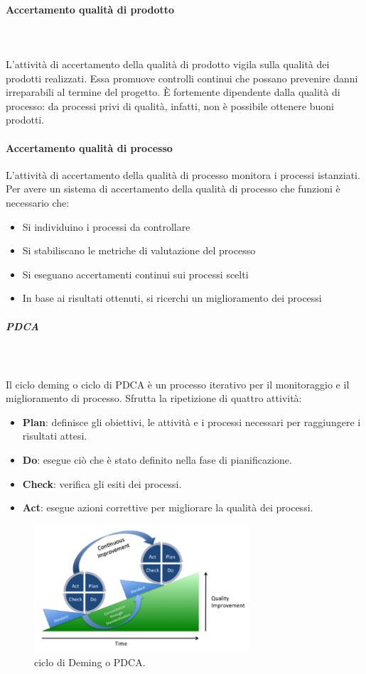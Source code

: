 \documentclass[../norme-di-progetto.tex]{subfiles}
\begin{document}
\paragraph{Accertamento qualità di prodotto}\mbox{}\\
\label{par:accertamento qualità di prodotto}
\\ L'attività di accertamento della qualità di prodotto vigila sulla qualità dei prodotti realizzati. Essa promuove controlli continui che possano prevenire danni irreparabili al termine del progetto. È fortemente dipendente dalla qualità di processo: da processi privi di qualità, infatti, non è possibile ottenere buoni prodotti.  
\paragraph{Accertamento qualità di processo}
\label{par:accertamento qualità di processo}
L'attività di accertamento della qualità di processo monitora i processi istanziati. Per avere un sistema di accertamento della qualità di processo che funzioni è necessario che:
\begin{itemize}
	\item Si individuino i processi da controllare
	\item Si stabiliscano le metriche di valutazione del processo
	\item Si eseguano accertamenti continui sui processi scelti
	\item In base ai risultati ottenuti, si ricerchi un miglioramento dei processi
\end{itemize} 
\subparagraph{PDCA}\mbox{}\\
\label{subp:PDCA}
\\Il ciclo deming o ciclo di PDCA è un processo iterativo per il monitoraggio e il miglioramento di processo. Sfrutta la ripetizione di quattro attività:
\begin{itemize}
	\item \textbf{Plan}: definisce gli obiettivi, le attività e i processi necessari per raggiungere i risultati attesi.
	\item \textbf{Do}: esegue ciò che è stato definito nella fase di pianificazione.
	\item \textbf{Check}: verifica gli esiti dei processi.
	\item \textbf{Act}: esegue azioni correttive per migliorare la qualità dei processi.
\end{itemize}
\begin{figure}[H]
\includegraphics[width=8cm]{components/PDCA-process.png}
\centering
\caption{ciclo di Deming o PDCA.}
\end{figure}
\end{document}
